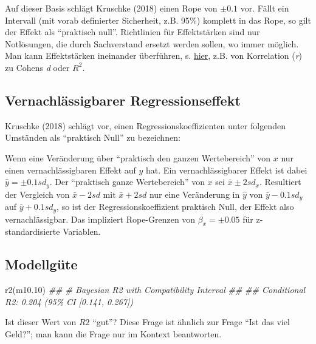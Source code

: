 \documentclass[
  a4paper,
  DIV=11]{scrreprt}
\newenvironment{Shaded}{\begin{snugshade}}{\end{snugshade}}
\newcommand{\DocumentationTok}[1]{\textcolor[rgb]{0.37,0.37,0.37}{\textit{#1}}}
\newcommand{\FloatTok}[1]{\textcolor[rgb]{0.68,0.00,0.00}{#1}}
\newcommand{\FunctionTok}[1]{\textcolor[rgb]{0.28,0.35,0.67}{#1}}
\newcommand{\NormalTok}[1]{\textcolor[rgb]{0.00,0.23,0.31}{#1}}
\theoremstyle{definition}
\theoremstyle{remark}
\begin{document}
Auf dieser Basis schlägt Kruschke (2018) einen Rope von \(\pm0.1\) vor.
Fällt ein Intervall (mit vorab definierter Sicherheit, z.B. 95\%)
komplett in das Rope, so gilt der Effekt als ``praktisch null''.
Richtlinien für Effektstärken sind nur Notlösungen, die durch
Sachverstand ersetzt werden sollen, wo immer möglich. Man kann
Effektstärken ineinander überführen, s.
\href{https://www.escal.site/}{hier}, z.B. von Korrelation (\emph{r}) zu
Cohens \emph{d} oder \(R^2\).

\hypertarget{vernachluxe4ssigbarer-regressionseffekt}{%
\subsection{Vernachlässigbarer
Regressionseffekt}\label{vernachluxe4ssigbarer-regressionseffekt}}

Kruschke (2018) schlägt vor, einen Regressionskoeffizienten unter
folgenden Umständen als ``praktisch Null'' zu bezeichnen:

Wenn eine Veränderung über ``praktisch den ganzen Wertebereich'' von
\(x\) nur einen vernachlässigbaren Effekt auf \(y\) hat. Ein
vernachlässigbarer Effekt ist dabei \(\hat{y}= \pm 0.1 sd_y\). Der
``praktisch ganze Wertebereich'' von \(x\) sei \(\bar{x} \pm 2 sd_x\).
Resultiert der Vergleich von \(\bar{x} -2 sd\) mit \(\bar{x}+2sd\) nur
eine Veränderung in \(\hat{y}\) von \(\bar{y} - 0.1sd_y\) auf
\(\bar{y} + 0.1 sd_y\), so ist der Regressionskoeffizient praktisch
Null, der Effekt also vernachlässigbar. Das impliziert Rope-Grenzen von
\(\beta_x = \pm 0.05\) für z-standardisierte Variablen.

\hypertarget{modellguxfcte}{%
\subsection{Modellgüte}\label{modellguxfcte}}

\begin{Shaded}
\begin{Highlighting}[]
\FunctionTok{r2}\NormalTok{(m10}\FloatTok{.10}\NormalTok{)}
\DocumentationTok{\#\# \# Bayesian R2 with Compatibility Interval}
\DocumentationTok{\#\# }
\DocumentationTok{\#\#   Conditional R2: 0.204 (95\% CI [0.141, 0.267])}
\end{Highlighting}
\end{Shaded}

Ist dieser Wert von \(R2\) ``gut''? Diese Frage ist ähnlich zur Frage
``Ist das viel Geld?''; man kann die Frage nur im Kontext beantworten.
\end{document}
